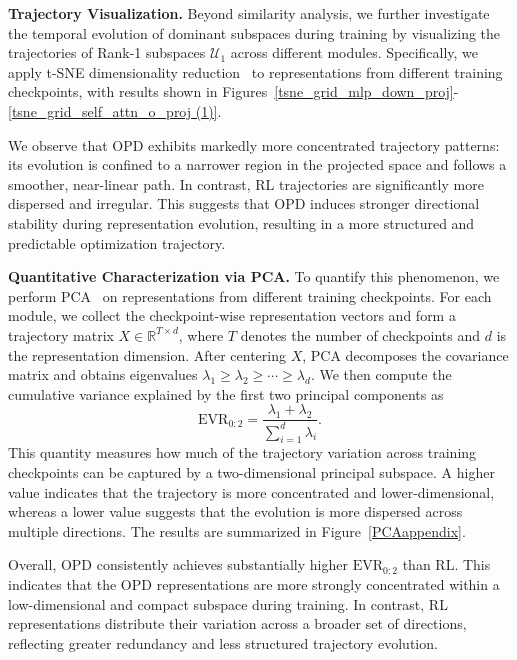 \documentclass{article}
\begin{document}
\textbf{Trajectory Visualization.}
Beyond similarity analysis, we further investigate the temporal evolution of dominant subspaces during training by visualizing the trajectories of Rank-1 subspaces \(\mathcal{U}_1\) across different modules. Specifically, we apply t-SNE dimensionality reduction~\citep{shi2021visualizingdatausinggtsne} to representations from different training checkpoints, with results shown in Figures~\ref{tsne_grid_mlp_down_proj}-\ref{tsne_grid_self_attn_o_proj (1)}.

We observe that OPD exhibits markedly more concentrated trajectory patterns: its evolution is confined to a narrower region in the projected space and follows a smoother, near-linear path. In contrast, RL trajectories are significantly more dispersed and irregular. This suggests that OPD induces stronger directional stability during representation evolution, resulting in a more structured and predictable optimization trajectory.

\textbf{Quantitative Characterization via PCA.}
To quantify this phenomenon, we perform PCA~\citep{Eckart1936TheAO} on representations from different training checkpoints. For each module, we collect the checkpoint-wise representation vectors and form a trajectory matrix \(X \in \mathbb{R}^{T \times d}\), where \(T\) denotes the number of checkpoints and \(d\) is the representation dimension. After centering \(X\), PCA decomposes the covariance matrix and obtains eigenvalues \(\lambda_1 \geq \lambda_2 \geq \cdots \geq \lambda_d\). We then compute the cumulative variance explained by the first two principal components as
\begin{equation}
\mathrm{EVR}_{0:2}
=
\frac{\lambda_1 + \lambda_2}{\sum_{i=1}^{d} \lambda_i}.
\end{equation}
This quantity measures how much of the trajectory variation across training checkpoints can be captured by a two-dimensional principal subspace. A higher value indicates that the trajectory is more concentrated and lower-dimensional, whereas a lower value suggests that the evolution is more dispersed across multiple directions. The results are summarized in Figure~\ref{PCAappendix}.

Overall, OPD consistently achieves substantially higher \(\mathrm{EVR}_{0:2}\) than RL. This indicates that the OPD representations are more strongly concentrated within a low-dimensional and compact subspace during training. In contrast, RL representations distribute their variation across a broader set of directions, reflecting greater redundancy and less structured trajectory evolution.
\end{document}

